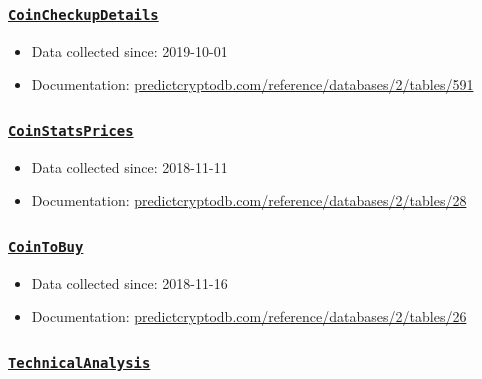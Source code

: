 \documentclass[
]{book}
\begin{document}
\hypertarget{coincheckupdetails}{%
\subsubsection{\texorpdfstring{\href{https://predictcryptodb.com/question/12}{\textbf{\texttt{CoinCheckupDetails}}}}{CoinCheckupDetails}}\label{coincheckupdetails}}

\begin{itemize}
\item
  Data collected since: 2019-10-01
\item
  Documentation: \href{https://predictcryptodb.com/reference/databases/2/tables/591}{predictcryptodb.com/reference/databases/2/tables/591}
\end{itemize}

\hypertarget{coinstatsprices}{%
\subsubsection{\texorpdfstring{\href{https://predictcryptodb.com/question/13}{\textbf{\texttt{CoinStatsPrices}}}}{CoinStatsPrices}}\label{coinstatsprices}}

\begin{itemize}
\item
  Data collected since: 2018-11-11
\item
  Documentation: \href{https://predictcryptodb.com/reference/databases/2/tables/28}{predictcryptodb.com/reference/databases/2/tables/28}
\end{itemize}

\hypertarget{cointobuy}{%
\subsubsection{\texorpdfstring{\href{https://predictcryptodb.com/question/14}{\textbf{\texttt{CoinToBuy}}}}{CoinToBuy}}\label{cointobuy}}

\begin{itemize}
\item
  Data collected since: 2018-11-16
\item
  Documentation: \href{https://predictcryptodb.com/reference/databases/2/tables/26}{predictcryptodb.com/reference/databases/2/tables/26}
\end{itemize}

\hypertarget{technicalanalysis}{%
\subsubsection{\texorpdfstring{\href{https://predictcryptodb.com/question/10}{\textbf{\texttt{TechnicalAnalysis}}}}{TechnicalAnalysis}}\label{technicalanalysis}}
\end{document}
